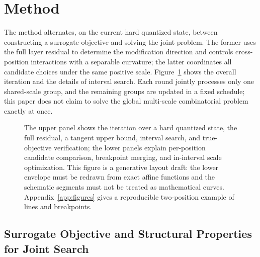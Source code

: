 \section{Method}

The method alternates, on the current hard quantized state, between constructing a surrogate objective and solving the joint problem.
The former uses the full layer residual to determine the modification direction and controls cross-position interactions with a separable curvature; the latter coordinates all candidate choices under the same positive scale.
Figure~\ref{fig:method} shows the overall iteration and the details of interval search.
Each round jointly processes only one shared-scale group, and the remaining groups are updated in a fixed schedule; this paper does not claim to solve the global multi-scale combinatorial problem exactly at once.

\begin{figure}[t]
\centering
{}
\caption{
The upper panel shows the iteration over a hard quantized state, the full residual, a tangent upper bound, interval search, and true-objective verification; the lower panels explain per-position candidate comparison, breakpoint merging, and in-interval scale optimization.
This figure is a generative layout draft: the lower envelope must be redrawn from exact affine functions and the schematic segments must not be treated as mathematical curves.
Appendix~\ref{app:figures} gives a reproducible two-position example of lines and breakpoints.
}
\label{fig:method}
\end{figure}

\subsection{Surrogate Objective and Structural Properties for Joint Search}

